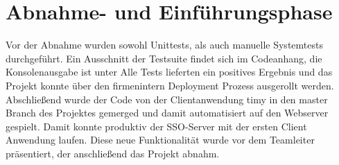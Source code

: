 \section{Abnahme- und Einführungsphase} 
\label{sec:AbnahmeEinfuehrung}

Vor der Abnahme wurden sowohl Unittests, als auch manuelle Systemtests durchgeführt. Ein Ausschnitt der Testsuite findet sich im Codeanhang, die Konsolenausgabe ist unter 
Alle Tests  lieferten ein positives Ergebnis und das Projekt konnte über den firmenintern Deployment Prozess ausgerollt werden.
Abschließend wurde der Code von der Clientanwendung timy in den master Branch des Projektes gemerged und damit automatisiert auf den Webserver gespielt.
Damit konnte produktiv der SSO-Server mit der ersten Client Anwendung laufen. 
Diese neue Funktionalität wurde vor dem Teamleiter präsentiert, der anschließend das Projekt abnahm.
